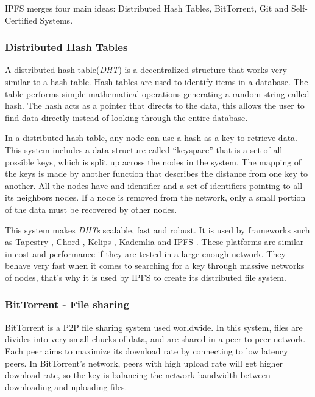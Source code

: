 IPFS merges four main ideas: Distributed Hash Tables, BitTorrent, Git and
Self-Certified Systems.

\subsubsection{Distributed Hash Tables}
\label{tech:sec:ipfs:dht}
A distributed hash table(\emph{DHT}) is a decentralized structure that works
very similar to a hash table. Hash tables are used to identify items in a
database. The table performs simple mathematical operations generating a random
string called hash. The hash acts as a pointer that directs to the data, this
allows the user to find data directly instead of looking through the entire
database\cite{kaluszka2010distributed}.

In a distributed hash table, any node can use a hash as a key to retrieve data.
This system includes a data structure called ``keyspace'' that is a set of all
possible keys, which is split up across the nodes in the system. The mapping of
the keys is made by another function that describes the distance from one key to
another. All the nodes have and identifier and a set of identifiers pointing to
all its neighbors nodes. If a node is removed from the network, only a small
portion of the data must be recovered by other
nodes\cite{kaluszka2010distributed}.

This system makes \emph{DHTs} scalable, fast and robust. It is used by
frameworks such as Tapestry \cite{zhao2004tapestry}, Chord
\cite{stoica2001chord}, Kelips \cite{gupta2003kelips}, Kademlia
\cite{maymounkov2002kademlia} and IPFS \cite{benet2014ipfs}. These platforms are
similar in cost and performance if they are tested in a large enough network.
They behave very fast when it comes to searching for a key through massive
networks of nodes\cite{li2004comparing}, that's why it is used by IPFS to create
its distributed file system.

\subsubsection{BitTorrent - File sharing}
\label{tech:sec:ipfs:bt}
BitTorrent \cite{cohen2003incentives} is a P2P file sharing system used
worldwide. In this system, files are divides into very small chucks of data, and
are shared in a peer-to-peer network. Each peer aims to maximize its download
rate by connecting to low latency peers. In BitTorrent's network, peers with
high upload rate will get higher download rate, so the key is balancing the
network bandwidth between downloading and uploading
files\cite{pouwelse2005bittorrent}.

